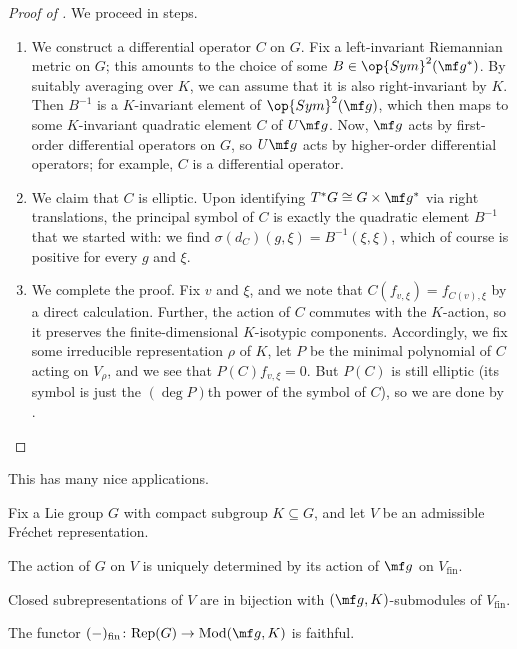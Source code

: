 \documentclass[../notes.tex]{subfiles}
\begin{document}
\begin{proof}[Proof of ]
	We proceed in steps.
	\begin{enumerate}
		\item We construct a differential operator $C$ on $G$. Fix a left-invariant Riemannian metric on $G$; this amounts to the choice of some $B\in\op{Sym}^2(\mf g^*)$. By suitably averaging over $K$, we can assume that it is also right-invariant by $K$. Then $B^{-1}$ is a $K$-invariant element of $\op{Sym}^2(\mf g)$, which then maps to some $K$-invariant quadratic element $C$ of $U\mf g$. Now, $\mf g$ acts by first-order differential operators on $G$, so $U\mf g$ acts by higher-order differential operators; for example, $C$ is a differential operator.

		\item We claim that $C$ is elliptic. Upon identifying $T^*G\cong G\times\mf g^*$ via right translations, the principal symbol of $C$ is exactly the quadratic element $B^{-1}$ that we started with: we find $\sigma(d_C)(g,\xi)=B^{-1}(\xi,\xi)$, which of course is positive for every $g$ and $\xi$.

		\item We complete the proof. Fix $v$ and $\xi$, and we note that $C(f_{v,\xi})=f_{C(v),\xi}$ by a direct calculation. Further, the action of $C$ commutes with the $K$-action, so it preserves the finite-dimensional $K$-isotypic components. Accordingly, we fix some irreducible representation $\rho$ of $K$, let $P$ be the minimal polynomial of $C$ acting on $V_\rho$, and we see that $P(C)f_{v,\xi}=0$. But $P(C)$ is still elliptic (its symbol is just the $(\deg P)$th power of the symbol of $C$), so we are done by .
		\qedhere
	\end{enumerate}
\end{proof}
This has many nice applications.
\begin{corollary} \label{cor:pass-to-g-k}
	Fix a Lie group $G$ with compact subgroup $K\subseteq G$, and let $V$ be an admissible Fr\'echet representation.
	\begin{listalph}
		\item The action of $G$ on $V$ is uniquely determined by its action of $\mf g$ on $V_{\mathrm{fin}}$.
		\item Closed subrepresentations of $V$ are in bijection with $(\mf g,K)$-submodules of $V_{\mathrm{fin}}$.
		\item The functor $(-)_{\mathrm{fin}}\colon\mathrm{Rep}(G)\to\mathrm{Mod}(\mf g,K)$ is faithful.
	\end{listalph}
\end{corollary}
\end{document}
